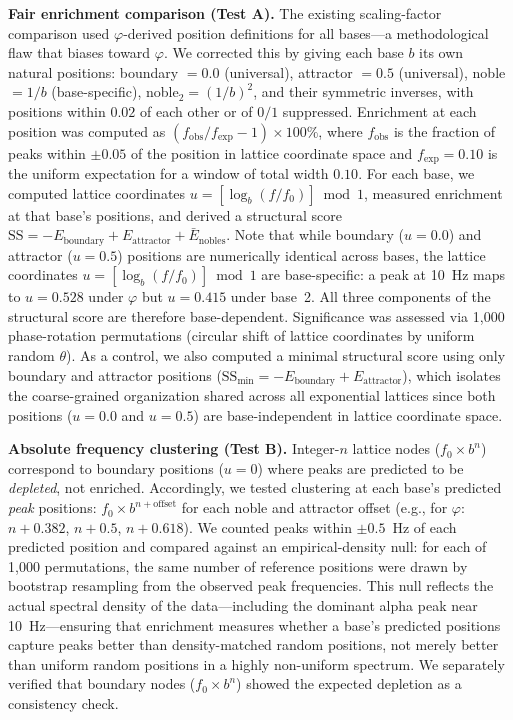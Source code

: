\documentclass[11pt,a4paper]{article}
\newcommand{\phisym}{\varphi}
\newcommand{\fzero}{f_0}
\begin{document}
\textbf{Fair enrichment comparison (Test A).} The existing scaling-factor comparison \parencite{lacy2026golden} used $\phisym$-derived position definitions for all bases---a methodological flaw that biases toward $\phisym$. We corrected this by giving each base $b$ its own natural positions: boundary $= 0.0$ (universal), attractor $= 0.5$ (universal), noble $= 1/b$ (base-specific), noble$_2 = (1/b)^2$, and their symmetric inverses, with positions within $0.02$ of each other or of $0/1$ suppressed. Enrichment at each position was computed as $(f_{\text{obs}} / f_{\text{exp}} - 1) \times 100\%$, where $f_{\text{obs}}$ is the fraction of peaks within $\pm 0.05$ of the position in lattice coordinate space and $f_{\text{exp}} = 0.10$ is the uniform expectation for a window of total width $0.10$. For each base, we computed lattice coordinates $u = [\log_b(f/\fzero)] \bmod 1$, measured enrichment at that base's positions, and derived a structural score $\text{SS} = -E_{\text{boundary}} + E_{\text{attractor}} + \bar{E}_{\text{nobles}}$. Note that while boundary ($u = 0.0$) and attractor ($u = 0.5$) positions are numerically identical across bases, the lattice coordinates $u = [\log_b(f/\fzero)] \bmod 1$ are base-specific: a peak at 10~Hz maps to $u = 0.528$ under $\phisym$ but $u = 0.415$ under base~2. All three components of the structural score are therefore base-dependent. Significance was assessed via 1,000 phase-rotation permutations (circular shift of lattice coordinates by uniform random $\theta$). As a control, we also computed a minimal structural score using only boundary and attractor positions ($\text{SS}_{\min} = -E_{\text{boundary}} + E_{\text{attractor}}$), which isolates the coarse-grained organization shared across all exponential lattices since both positions ($u = 0.0$ and $u = 0.5$) are base-independent in lattice coordinate space.

\textbf{Absolute frequency clustering (Test B).} Integer-$n$ lattice nodes ($\fzero \times b^n$) correspond to boundary positions ($u = 0$) where peaks are predicted to be \emph{depleted}, not enriched. Accordingly, we tested clustering at each base's predicted \emph{peak} positions: $\fzero \times b^{n + \text{offset}}$ for each noble and attractor offset (e.g., for $\phisym$: $n + 0.382$, $n + 0.5$, $n + 0.618$). We counted peaks within $\pm 0.5$~Hz of each predicted position and compared against an empirical-density null: for each of 1,000 permutations, the same number of reference positions were drawn by bootstrap resampling from the observed peak frequencies. This null reflects the actual spectral density of the data---including the dominant alpha peak near 10~Hz---ensuring that enrichment measures whether a base's predicted positions capture peaks better than density-matched random positions, not merely better than uniform random positions in a highly non-uniform spectrum. We separately verified that boundary nodes ($\fzero \times b^n$) showed the expected depletion as a consistency check.
\end{document}
